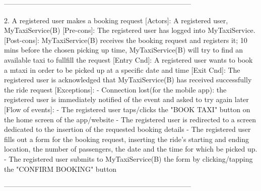 \documentclass[11pt]{article} %
\begin{document}
      --------------------------------------------------------------------------------

      2. A registered user makes a booking request
         [Actors]: A registered user, MyTaxiService(B)
         [Pre-cons]: The registered user has logged into MyTaxiService.
         [Post-cons]: MyTaxiService(B) receives the booking request and registers it; 10 mins before
         the chosen picking up time, MyTaxiService(B) will try to find an available taxi to fullfill the request
         [Entry Cnd]: A registered user wants to book a mtaxi in order to be picked up at a specific date and time
         [Exit Cnd]: The registered user is acknowledged that MyTaxiService(B) has received successfully the ride
         request
         [Exceptions]:
           - Connection lost(for the mobile app): the registered user is immediately notified of the event and
           asked to try again later
         [Flow of events]:
           - The registered user taps/clicks the "BOOK TAXI" button on the home screen of the app/website
           - The registered user is redirected to a screen dedicated to the insertion
           of the requested booking details
           - The registered user fills out a form for the booking request, inserting the ride's starting and ending location,
           the number of passengers, the date and the time for which be picked up.
           - The registered user submits to MyTaxiService(B) the form by clicking/tapping the "CONFIRM BOOKING" button

      --------------------------------------------------------------------------------
\end{document}

